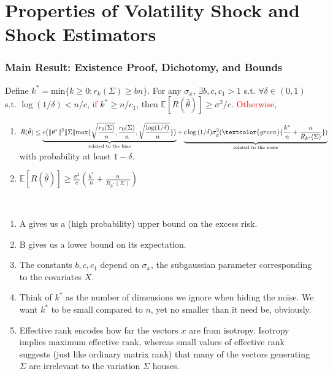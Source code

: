 \documentclass[pdf]{beamer}
\begin{document}
\section{Properties of Volatility Shock and Shock Estimators}

\begin{frame}
\fontsize{8pt}{9pt}
\frametitle{Main Result: Existence Proof, Dichotomy, and Bounds}

\begin{theorem}
Define $k^{*}= \text{min}\{ k\geq 0 : r_{k}(\Sigma) \geq bn \} $.  For any $\sigma_{x}$, $\exists b, c, c_{1} > 1$ s.t. $\forall\delta  \in (0,1)$ s.t. $\log({1/\delta}) < n/c$, \textcolor{red}{if} $k^{*} \geq n / c_{1}$, then $\mathbb{E}[R(\hat\theta)] \geq \sigma^{2}/c$.  \textcolor{red}{Otherwise},
        \begin{enumerate}[A]
        \item $R(\hat\theta) \leq \underbrace{c\big( \| \theta^{*} \|^{2}\| \Sigma \| \text{max}\{ \sqrt{\frac{r_{0}(\Sigma)}{n}}, \frac{r_{0}(\Sigma)}{n}, \sqrt{\frac{\log(1/\delta)}{n}} \}\big) }_\text{related to the bias}  + \underbrace{ c\log{ (1/\delta) }\sigma^{2}_{y}(  \textcolor{green}{\frac{k^{*}}{n} + \frac{n}{R_{k^{*}}(\Sigma)} } ) }_\text{related to the noise}$ with probability at least $1 - \delta$.
        \item $\mathbb{E}[R(\hat\theta)] \geq \frac{\sigma^{2}}{c}(  \frac{k^{*}}{n} + \frac{n}{R_{k^{*}}(\Sigma)} )$
        \end{enumerate}
\end{theorem}

\\
\begin{enumerate}
\item<3-7> A gives us a (high probability) upper bound on the excess risk.
\item<4-7> B gives us a lower bound on its expectation.
\item<5-7> The constants $b, c, c_{1}$ depend on $\sigma_{x}$, the subgaussian parameter corresponding to the covariates $X$.
\item<6-7> Think of $k^{*}$ as the number of dimensions we ignore when hiding the noise.  We want $k^{*}$ to be small compared to $n$, yet no smaller than it need be, obviously.
\item<7-7> Effective rank encodes how far the vectors $x$ are from isotropy.  Isotropy implies maximum effective rank, whereas small values of effective rank suggests (just like ordinary matrix rank) that many of the vectors generating $\Sigma$ are irrelevant to the variation $\Sigma$  houses.

\end{enumerate}
\end{frame}
\end{document}
